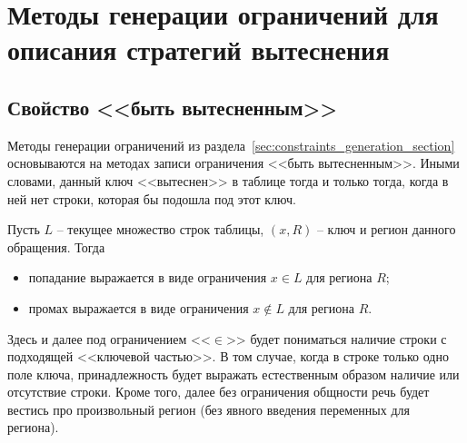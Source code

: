 %


\chapter{Методы генерации ограничений для описания стратегий вытеснения}\label{sec:vytesnenie}

\section{Свойство <<быть вытесненным>>}

Методы генерации ограничений из раздела~\ref{sec:constraints_generation_section} основываются на методах записи ограничения <<быть вытесненным>>. Иными словами, данный ключ <<вытеснен>> в таблице тогда и только тогда, когда в ней нет строки, которая бы подошла под этот ключ.

\begin{utv}\label{hit_miss_simpleform}
Пусть $L$ -- текущее множество строк таблицы, $(x,R)$ -- ключ и регион данного обращения. Тогда
\begin{itemize}
\item попадание выражается в виде ограничения $x \in L$ для региона $R$;
\item промах выражается в виде ограничения $x \notin L$ для региона $R$.
\end{itemize}
\end{utv}

Здесь и далее под ограничением <<$\in$>> будет пониматься наличие строки с
подходящей <<ключевой частью>>. В том случае, когда в строке только одно поле
ключа, принадлежность будет выражать естественным образом наличие или отсутствие
строки. Кроме того, далее без ограничения общности речь будет вестись про
произвольный регион (без явного введения переменных для региона).

